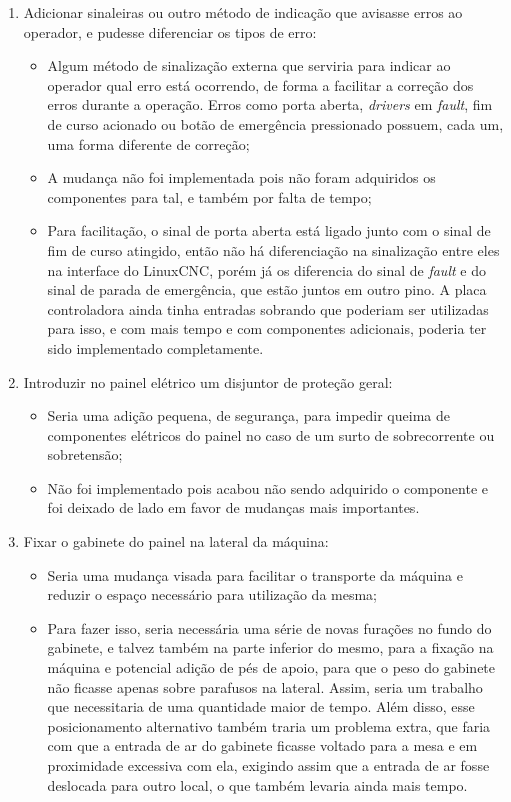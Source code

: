 \documentclass[
	article,			%
	11pt,				%
	oneside,			%
	a4paper,			%
	section=TITLE,		%
	english,			%
	brazil,				%
	sumario=tradicional
	]{abntex2}
\newcommand{\LCNC}{LinuxCNC}
\begin{document}
\begin{enumerate}
\begin{itemize}
    \end{itemize}
    \item Adicionar sinaleiras ou outro método de indicação que avisasse erros ao operador, e pudesse diferenciar os tipos de erro:
    \begin{itemize}
        \item Algum método de sinalização externa que serviria para indicar ao operador qual erro está ocorrendo, de forma a facilitar a correção dos erros durante a operação. Erros como porta aberta, \textit{drivers} em \textit{fault}, fim de curso acionado ou botão de emergência pressionado possuem, cada um, uma forma diferente de correção;
        \item A mudança não foi implementada pois não foram adquiridos os componentes para tal, e também por falta de tempo;
        \item Para facilitação, o sinal de porta aberta está ligado junto com o sinal de fim de curso atingido, então não há diferenciação na sinalização entre eles na interface do \LCNC, porém já os diferencia do sinal de \textit{fault} e do sinal de parada de emergência, que estão juntos em outro pino. A placa controladora ainda tinha entradas sobrando que poderiam ser utilizadas para isso, e com mais tempo e com componentes adicionais, poderia ter sido implementado completamente.
    \end{itemize}
    \item Introduzir no painel elétrico um disjuntor de proteção geral:
    \begin{itemize}
        \item Seria uma adição pequena, de segurança, para impedir queima de componentes elétricos do painel no caso de um surto de sobrecorrente ou sobretensão;
        \item Não foi implementado pois acabou não sendo adquirido o componente e foi deixado de lado em favor de mudanças mais importantes.
    \end{itemize}
    \item Fixar o gabinete do painel na lateral da máquina:
    \begin{itemize}
        \item Seria uma mudança visada para facilitar o transporte da máquina e reduzir o espaço necessário para utilização da mesma;
        \item Para fazer isso, seria necessária uma série de novas furações no fundo do gabinete, e talvez também na parte inferior do mesmo, para a fixação na máquina e potencial adição de pés de apoio, para que o peso do gabinete não ficasse apenas sobre parafusos na lateral. Assim, seria um trabalho que necessitaria de uma quantidade maior de tempo. Além disso, esse posicionamento alternativo também traria um problema extra, que faria com que a entrada de ar do gabinete ficasse voltado para a mesa e em proximidade excessiva com ela, exigindo assim que a entrada de ar fosse deslocada para outro local, o que também levaria ainda mais tempo.

\end{itemize}
\end{enumerate}
\end{document}

